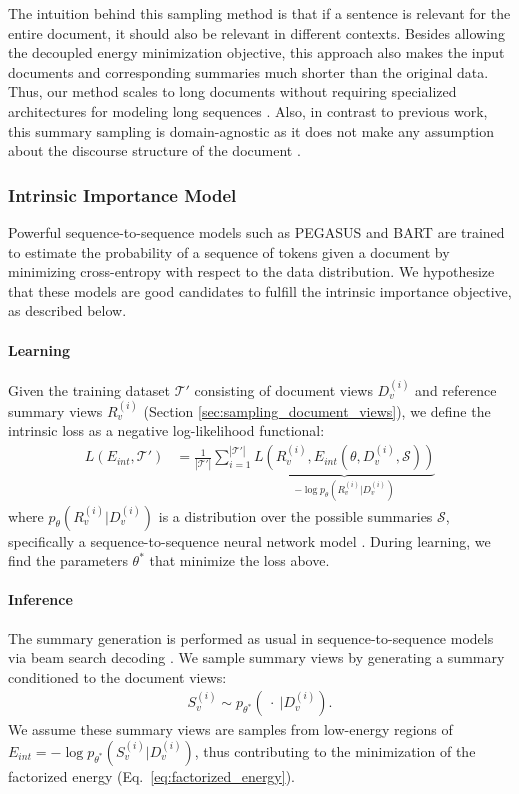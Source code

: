 \documentclass[11pt,table]{article}
\begin{document}
The intuition behind this sampling method is that if a sentence is relevant for the entire document, it should also be relevant in different contexts. Besides allowing the decoupled energy minimization objective, this approach also makes the input documents and corresponding summaries much shorter than the original data. Thus, our method scales to long documents without requiring specialized architectures for modeling long sequences \citep{beltagy2020longformer, zaheer2020big}. Also, in contrast to previous work, this summary sampling is domain-agnostic as it does not make any assumption about the discourse structure of the document \citep{dong-etal-2021-discourse, gidiotis2020divide}.

\subsubsection{Intrinsic Importance Model}
\label{sec:intrinsic_importance}
Powerful sequence-to-sequence models such as PEGASUS \citep{zhang2020pegasus} and BART \citep{lewis2019bart} are trained to estimate the probability of a sequence of tokens given a document by minimizing cross-entropy with respect to the data distribution. We hypothesize that these models are good candidates to fulfill the intrinsic importance objective, as described below.

\paragraph{Learning}
Given the training dataset $\mathcal{T'}$ consisting of document views $D^{(i)}_v$ and reference summary views $R^{(i)}_v$ (Section \ref{sec:sampling_document_views}), we define the intrinsic loss as a negative log-likelihood functional:
\begin{align} \label{eq:intrinsic_loss}
L(E_{int}, \mathcal{T}') &= \frac{1}{|\mathcal{T}'|} \sum_{i=1}^{|\mathcal{T}'|} \underbrace{L(R^{(i)}_v, E_{int}(\theta, D^{(i)}_v, \mathcal{S}))}_{-\displaystyle {\log p_\theta(R^{(i)}_v | D^{(i)}_v)}} \nonumber 
\end{align}
where $p_\theta(R^{(i)}_v | D^{(i)}_v)$ is a distribution over the possible summaries $\mathcal{S}$, specifically a sequence-to-sequence neural network model \citep{lewis2019bart}. During learning, we find the parameters $\theta^*$ that minimize the loss above.

\paragraph{Inference} 
The summary generation is performed as usual in sequence-to-sequence models via beam search decoding \citep{sutskever2014sequence}. We sample summary views by generating a summary conditioned to the document views:
\begin{align}
S^{(i)}_v \sim p_{\theta^*}(\ \cdot\ | D^{(i)}_v).
\end{align}
We assume these summary views are samples from low-energy regions of $E_{int} = -\log p_{\theta^*}(S^{(i)}_v | D^{(i)}_v)$, thus contributing to the minimization of the factorized energy (Eq.~\ref{eq:factorized_energy}).
\end{document}
